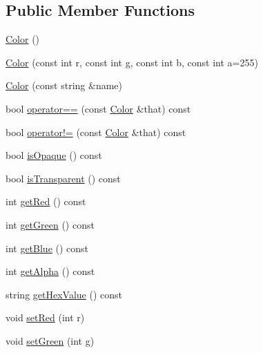 \subsection*{Public Member Functions}
\begin{DoxyCompactItemize}
\item 
\hyperlink{classbridges_1_1datastructure_1_1_color_ad6b8b6b89a54ebea80d211679e10be3e}{Color} ()
\item 
\hyperlink{classbridges_1_1datastructure_1_1_color_a5f4cd55fae020f97b8715dc42475d0c1}{Color} (const int r, const int g, const int b, const int a=255)
\item 
\hyperlink{classbridges_1_1datastructure_1_1_color_a9db6443e24d6f946c085b2d8677d9c52}{Color} (const string \&name)
\item 
bool \hyperlink{classbridges_1_1datastructure_1_1_color_a43a31ca1f860081116197c9b29e4aa45}{operator==} (const \hyperlink{classbridges_1_1datastructure_1_1_color}{Color} \&that) const
\item 
bool \hyperlink{classbridges_1_1datastructure_1_1_color_aa3eb6797dc6d27681415569cf67d9196}{operator!=} (const \hyperlink{classbridges_1_1datastructure_1_1_color}{Color} \&that) const
\item 
bool \hyperlink{classbridges_1_1datastructure_1_1_color_acd9400b1b5f621e9147204e2bee5e29a}{is\+Opaque} () const
\item 
bool \hyperlink{classbridges_1_1datastructure_1_1_color_a82713b25585724ddcb73d3c209aaaad9}{is\+Transparent} () const
\item 
int \hyperlink{classbridges_1_1datastructure_1_1_color_a7460203f01e0437e7ce23d85bffdb7ed}{get\+Red} () const
\item 
int \hyperlink{classbridges_1_1datastructure_1_1_color_a4e97402d8321374a6d97327dad603341}{get\+Green} () const
\item 
int \hyperlink{classbridges_1_1datastructure_1_1_color_a07ea27d8745ddec7834fe9ec7fca4032}{get\+Blue} () const
\item 
int \hyperlink{classbridges_1_1datastructure_1_1_color_a07964b6c9fce8c3b4a3ba28169bf2103}{get\+Alpha} () const
\item 
string \hyperlink{classbridges_1_1datastructure_1_1_color_a494648d2940754828f2054f92de031dc}{get\+Hex\+Value} () const
\item 
void \hyperlink{classbridges_1_1datastructure_1_1_color_a487be07319fe83e9642cd0387ebed33a}{set\+Red} (int r)
\item 
void \hyperlink{classbridges_1_1datastructure_1_1_color_ac1ac36232f13188eac0d7270a946261a}{set\+Green} (int g)

\end{DoxyCompactItemize}
